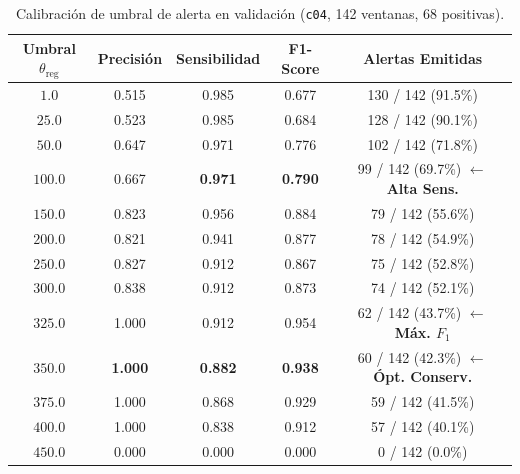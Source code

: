 \documentclass[11pt,a4paper]{article}
\begin{document}
\begin{table}[H]
\centering
\footnotesize
\caption{Calibración de umbral de alerta en validación (\texttt{c04}, 142 ventanas, 68 positivas).}
\label{tab:barrido_val}
\begin{tabular}{ccccc}
\toprule
\textbf{Umbral $\theta_{\text{reg}}$} & \textbf{Precisión} & \textbf{Sensibilidad} & \textbf{F1-Score} & \textbf{Alertas Emitidas} \\
\midrule
$1.0$   & 0.515 & 0.985 & 0.677 & 130 / 142 (91.5\%) \\
$25.0$  & 0.523 & 0.985 & 0.684 & 128 / 142 (90.1\%) \\
$50.0$  & 0.647 & 0.971 & 0.776 & 102 / 142 (71.8\%) \\
$100.0$ & 0.667 & \textbf{0.971} & \textbf{0.790} & 99 / 142 (69.7\%) $\leftarrow$ \textbf{Alta Sens.} \\
$150.0$ & 0.823 & 0.956 & 0.884 & 79 / 142 (55.6\%) \\
$200.0$ & 0.821 & 0.941 & 0.877 & 78 / 142 (54.9\%) \\
$250.0$ & 0.827 & 0.912 & 0.867 & 75 / 142 (52.8\%) \\
$300.0$ & 0.838 & 0.912 & 0.873 & 74 / 142 (52.1\%) \\
$325.0$ & 1.000 & 0.912 & 0.954 & 62 / 142 (43.7\%) $\leftarrow$ \textbf{Máx. $F_1$} \\
$350.0$ & \textbf{1.000} & \textbf{0.882} & \textbf{0.938} & 60 / 142 (42.3\%) $\leftarrow$ \textbf{Ópt. Conserv.} \\
$375.0$ & 1.000 & 0.868 & 0.929 & 59 / 142 (41.5\%) \\
$400.0$ & 1.000 & 0.838 & 0.912 & 57 / 142 (40.1\%) \\
$450.0$ & 0.000 & 0.000 & 0.000 & 0 / 142 (0.0\%) \\
\bottomrule
\end{tabular}
\end{table}
\end{document}
